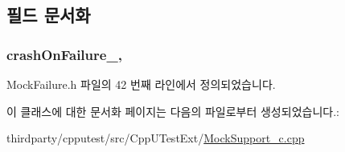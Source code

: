 \subsection{필드 문서화}
\subsubsection[{\texorpdfstring{crash\+On\+Failure\+\_\+}{crashOnFailure_}}]{ crash\+On\+Failure\+\_\+\hspace{0.3cm}{\ttfamily [protected]}, {\ttfamily [inherited]}}\hypertarget{class_mock_failure_reporter_a9faf961cbe6687577f4eaae4625bcbea}{}\label{class_mock_failure_reporter_a9faf961cbe6687577f4eaae4625bcbea}


Mock\+Failure.\+h 파일의 42 번째 라인에서 정의되었습니다.



이 클래스에 대한 문서화 페이지는 다음의 파일로부터 생성되었습니다.\+:\begin{DoxyCompactItemize}
\item 
thirdparty/cpputest/src/\+Cpp\+U\+Test\+Ext/\hyperlink{_mock_support__c_8cpp}{Mock\+Support\+\_\+c.\+cpp}\end{DoxyCompactItemize}
